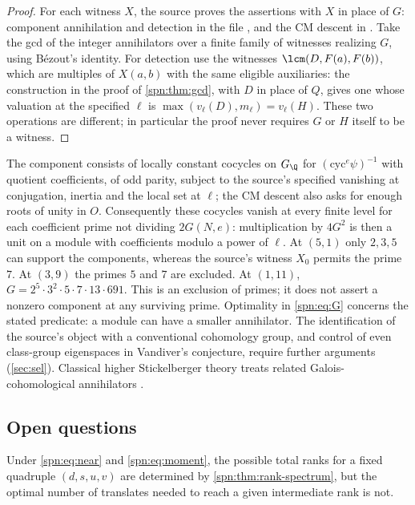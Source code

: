 \begin{proof}
For each witness $X$, the source proves the assertions with $X$ in place of
$G$: component annihilation and detection in the file
, and the CM descent in
. Take the gcd of the integer annihilators over a finite
family of witnesses realizing $G$, using B\'ezout's identity. For detection
use the witnesses $\lcm(D,F(a),F(b))$, which are multiples of $X(a,b)$ with
the same eligible auxiliaries: the construction in the proof of
\cref{spn:thm:gcd}, with $D$ in place of $Q$, gives one whose valuation at
the specified $\ell$ is $\max(v_\ell(D),m_\ell)=v_\ell(H)$. These two
operations are different; in particular the proof never requires $G$ or $H$
itself to be a witness.
\end{proof}

The component consists of locally constant cocycles on $G_\Q$ for
$(\mathrm{cyc}^e\psi)^{-1}$ with quotient coefficients, of odd parity,
subject to the source's specified vanishing at conjugation, inertia and the
local set at $\ell$; the CM descent also asks for enough roots of unity in
$O$. Consequently these cocycles vanish at every finite level for each
coefficient prime not dividing $2G(N,e)$: multiplication by $4G^2$ is then a
unit on a module with coefficients modulo a power of $\ell$. At $(5,1)$ only
$2,3,5$ can support the components, whereas the source's witness $X_0$
permits the prime $7$. At $(3,9)$ the primes $5$ and $7$ are excluded. At
$(1,11)$, $G=2^5\cdot3^2\cdot5\cdot7\cdot13\cdot691$. This is an exclusion of
primes; it does not assert a nonzero component at any surviving prime.
Optimality in \eqref{spn:eq:G} concerns the stated predicate: a module can
have a smaller annihilator. The identification of the source's object with a
conventional cohomology group, and control of even class-group eigenspaces in
Vandiver's conjecture, require further arguments (\cref{sec:sel}). Classical
higher Stickelberger theory treats related Galois-cohomological annihilators
\cite{Banaszak2003Higher}.

\subsection{Open questions}\label{spn:sec:open}

\begin{question}\label{spn:q:selection}
Under \eqref{spn:eq:near} and \eqref{spn:eq:moment}, the possible total ranks for a fixed quadruple
$(d,s,u,v)$ are determined by \cref{spn:thm:rank-spectrum}, but the optimal number of translates
needed to reach a given intermediate rank is not.
\end{question}

